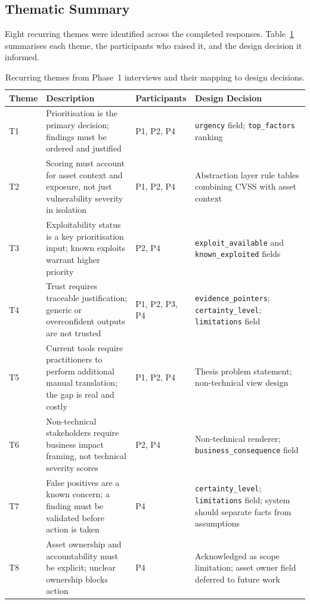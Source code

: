 \subsection*{Thematic Summary}
\label{subsec:thematic-summary}

Eight recurring themes were identified across the completed responses. Table~\ref{tab:themes} summarises each theme, the participants who raised it, and the design decision it informed.

\begin{table}[h]
\centering
\begin{tabular}{@{}lp{}lp{}@{}}
\toprule
\textbf{Theme} & \textbf{Description} & \textbf{Participants} & \textbf{Design Decision} \\
\midrule
T1 & Prioritisation is the primary decision; findings must be ordered and justified & P1, P2, P4 & \texttt{urgency} field; \texttt{top\_factors} ranking \\
\midrule
T2 & Scoring must account for asset context and exposure, not just vulnerability severity in isolation & P1, P2, P4 & Abstraction layer rule tables combining \ac{CVSS} with asset context \\
\midrule
T3 & Exploitability status is a key prioritisation input; known exploits warrant higher priority & P2, P4 & \texttt{exploit\_available} and \texttt{known\_exploited} fields \\
\midrule
T4 & Trust requires traceable justification; generic or overconfident outputs are not trusted & P1, P2, P3, P4 & \texttt{evidence\_pointers}; \texttt{certainty\_level}; \texttt{limitations} field \\
\midrule
T5 & Current tools require practitioners to perform additional manual translation; the gap is real and costly & P1, P2, P4 & Thesis problem statement; non-technical view design \\
\midrule
T6 & Non-technical stakeholders require business impact framing, not technical severity scores & P2, P4 & Non-technical renderer; \texttt{business\_consequence} field \\
\midrule
T7 & False positives are a known concern; a finding must be validated before action is taken & P4 & \texttt{certainty\_level}; \texttt{limitations} field; system should separate facts from assumptions \\
\midrule
T8 & Asset ownership and accountability must be explicit; unclear ownership blocks action & P4 & Acknowledged as scope limitation; asset owner field deferred to future work \\
\bottomrule
\end{tabular}
\caption{Recurring themes from Phase~1 interviews and their mapping to design decisions.}
\label{tab:themes}
\end{table}

